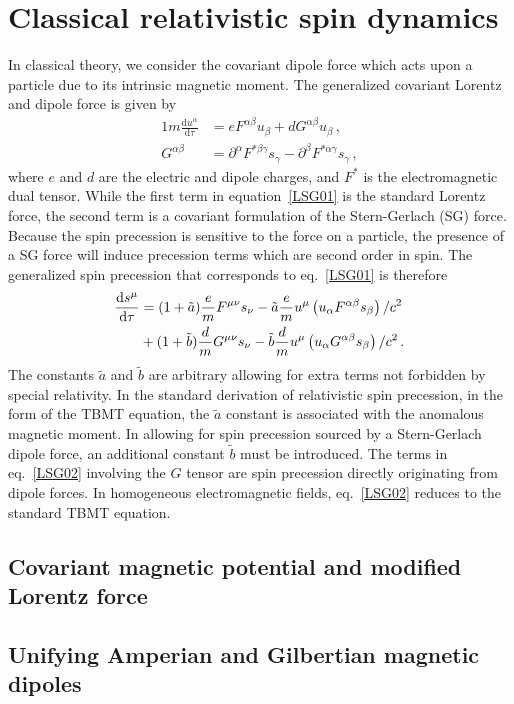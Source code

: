 \section{Classical relativistic spin dynamics}
\label{sec:cspin}
\noindent In classical theory, we consider the covariant dipole force which acts upon a particle due to its intrinsic magnetic moment. The generalized covariant Lorentz and dipole force is given by
\begin{alignat}{1}
  \label{LSG01} m\frac{\mathrm{d}u^{\alpha}}{\mathrm{d}\tau}&=eF^{\alpha\beta}u_{\beta}+dG^{\alpha\beta}u_{\beta}\,,\\
  \label{LSG02} G^{\alpha\beta}&=\partial^{\alpha}F^{*\beta\gamma}s_{\gamma}-\partial^{\beta}F^{*\alpha\gamma}s_{\gamma}\,,
\end{alignat}
where $e$ and $d$ are the electric and dipole charges, and $F^{*}$ is the electromagnetic dual tensor. While the first term in equation~\eqref{LSG01} is the standard Lorentz force, the second term is a covariant formulation of the Stern-Gerlach (SG) force. Because the spin precession is sensitive to the force on a particle, the presence of a SG force will induce precession terms which are second order in spin. The generalized spin precession that corresponds to eq.~\eqref{LSG01} is therefore
\begin{alignat}{1}
  \notag\frac{\mathrm{d}s^{\mu}}{\mathrm{d}\tau}&=(1+\tilde{a})\frac{e}{m}F^{\mu\nu}s_{\nu}-\tilde{a}\frac{e}{m}u^{\mu}\left(u_{\alpha}F^{\alpha\beta}s_{\beta}\right)/c^{2}\\
  \label{LSG03}&+(1+\tilde{b})\frac{d}{m}G^{\mu\nu}s_{\nu}-\tilde{b}\frac{d}{m}u^{\mu}\left(u_{\alpha}G^{\alpha\beta}s_{\beta}\right)/c^{2}\,.
\end{alignat}
The constants $\tilde{a}$ and $\tilde{b}$ are arbitrary allowing for extra terms not forbidden by special relativity. In the standard derivation of relativistic spin precession, in the form of the TBMT equation, the $\tilde{a}$ constant is associated with the anomalous magnetic moment. In allowing for spin precession sourced by a Stern-Gerlach dipole force, an additional constant $\tilde{b}$ must be introduced. The terms in eq.~\eqref{LSG02} involving the $G$ tensor are spin precession directly originating from dipole forces. In homogeneous electromagnetic fields, eq.~\eqref{LSG02} reduces to the standard TBMT equation.
\subsection{Covariant magnetic potential and modified Lorentz force}
\label{sec:magpotential}
\subsection{Unifying Amperian and Gilbertian magnetic dipoles}
\label{sec:ampgil}